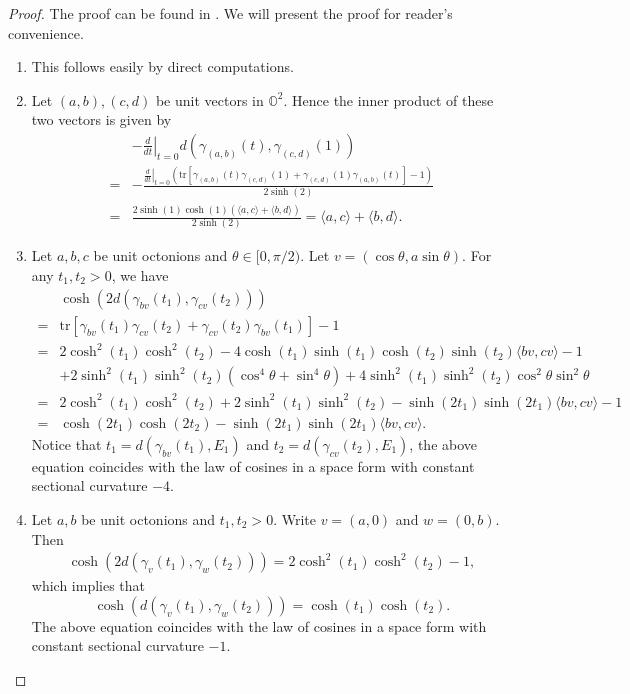 \documentclass{article}
\newcommand{\OO}{\mathbb{O}}
\newcommand{\tr}{\mathrm{tr}}
\theoremstyle{definition}
\begin{document}
\begin{proof}
The proof can be found in \cite[Proposition A.5]{Ruan1}. We will present the proof for reader's convenience.
\begin{enumerate}
\item[(1).] This follows easily by direct computations.
\item[(2).] Let $(a,b),(c,d)$ be unit vectors in $\OO^2$. Hence the inner product of these two vectors is given by
\begin{align*}
&-\left.\frac{d}{dt}\right|_{t=0}d(\gamma_{(a,b)}(t),\gamma_{(c,d)}(1)) \\=&-\frac{\left.\frac{d}{dt}\right|_{t=0}\left(\tr[\gamma_{(a,b)}(t)\gamma_{(c,d)}(1)+\gamma_{(c,d)}(1)\gamma_{(a,b)}(t)]-1\right)}{2\sinh(2)} \\
=&\frac{2\sinh(1)\cosh(1)(\langle a,c\rangle+\langle b,d\rangle)}{2\sinh(2)} 
=\langle a,c\rangle+\langle b,d\rangle.
\end{align*}
\item[(3).] Let $a,b,c$ be unit octonions and $\theta\in[0,\pi/2)$. Let $v=(\cos\theta,a\sin\theta)$. For any $t_1,t_2>0$, we have
\begin{align*}
&\cosh(2d(\gamma_{bv}(t_1),\gamma_{cv}(t_2)))\\
=&\tr[\gamma_{bv}(t_1)\gamma_{cv}(t_2)+\gamma_{cv}(t_2)\gamma_{bv}(t_1)]-1 \\
=&2\cosh^2(t_1)\cosh^2(t_2)-4\cosh(t_1)\sinh(t_1)\cosh(t_2)\sinh(t_2)\langle bv,cv\rangle -1\\
&+2\sinh^2(t_1)\sinh^2(t_2)(\cos^4\theta+\sin^4\theta)+4\sinh^2(t_1)\sinh^2(t_2)\cos^2\theta\sin^2\theta \\
=&2\cosh^2(t_1)\cosh^2(t_2)+2\sinh^2(t_1)\sinh^2(t_2)-\sinh(2t_1)\sinh(2t_1)\langle bv,cv\rangle -1 \\
=&\cosh(2t_1)\cosh(2t_2)-\sinh(2t_1)\sinh(2t_1)\langle bv,cv\rangle.
\end{align*}
Notice that $t_1=d(\gamma_{bv}(t_1),E_1)$ and $t_2=d(\gamma_{cv}(t_2),E_1)$, the above equation coincides with the law of cosines in a space form with constant sectional curvature $-4$.
\item[(4).] Let $a,b$ be unit octonions and $t_1,t_2>0$. Write $v=(a,0)$ and $w=(0,b)$. Then
\begin{align*}
\cosh(2d(\gamma_{v}(t_1),\gamma_{w}(t_2)))=2\cosh^2(t_1)\cosh^2(t_2)-1,
\end{align*}
which implies that 
$$\cosh(d(\gamma_{v}(t_1),\gamma_{w}(t_2)))=\cosh(t_1)\cosh(t_2).$$
The above equation coincides with the law of cosines in a space form with constant sectional curvature $-1$.\qedhere
\end{enumerate}
\end{proof}
\end{document}
